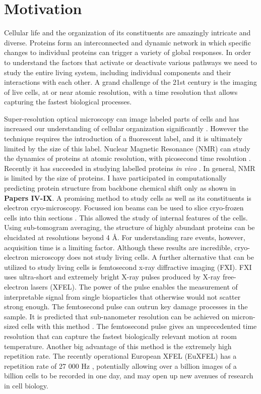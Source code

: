 \chapter{Motivation}
Cellular life and the organization of its constituents are amazingly intricate and diverse. Proteins form an interconnected and dynamic network in which specific changes to individual proteins can trigger a variety of global responses. In order to understand the factors that activate or deactivate various pathways we need to study  the entire living system, including individual components and their interactions with each other. A grand challenge of the 21st century is the imaging of live cells, at or near atomic resolution, with a time resolution that allows capturing the fastest biological processes. 

Super-resolution optical microscopy can image labeled parts of cells and has increased our understanding of cellular organization significantly \cite{Betzig2006}. However the technique requires the introduction of a fluorescent label, and it is ultimately limited by the size of this label. Nuclear Magnetic Resonance (NMR) can study the dynamics of proteins at atomic resolution, with picosecond time resolution \cite{Sapienza2010}. Recently it has succeeded in studying labelled proteins \textit{in vivo} \cite{Ye2013}. In general, NMR is limited by the size of proteins. I have participated in computationally predicting protein structure from backbone chemical shift only as shown in \textbf{Papers IV-IX}. A promising method to study cells as well as its constituents is electron cryo-microscopy. Focussed ion beams can be used to slice cryo-frozen cells into thin sections \cite{Marko2007}. This allowed the study of internal features of the cells. Using sub-tomogram averaging, the structure of highly abundant proteins can be elucidated at resolutions beyond 4 \AA  \cite{Schur2016}. For understanding rare events, however, acquisition time is a limiting factor. Although these results are incredible, cryo-electron microscopy does not study living cells. A further alternative that can be utilized to study living cells is femtosecond x-ray diffractive imaging (FXI). FXI uses ultra-short and extremely bright X-ray pulses produced by X-ray free-electron lasers (XFEL). The power of the pulse enables the measurement of interpretable signal from single bioparticles that otherwise would not scatter strong enough. The femtosecond pulse can outrun key damage processes in the sample. It is predicted that sub-nanometer resolution can be achieved on micron-sized cells with this method \cite{Bergh2008}. The femtosecond pulse gives an unprecedented time resolution that can capture the fastest biologically relevant motion at room temperature. Another big advantage of this method is the extremely high repetition rate. The recently operational European XFEL (EuXFEL) has a repetition rate of 27 000 Hz \cite{Altarelli2006}, potentially allowing over a billion images of a billion cells to be recorded in one day, and may open up new avenues of research in cell biology. 

